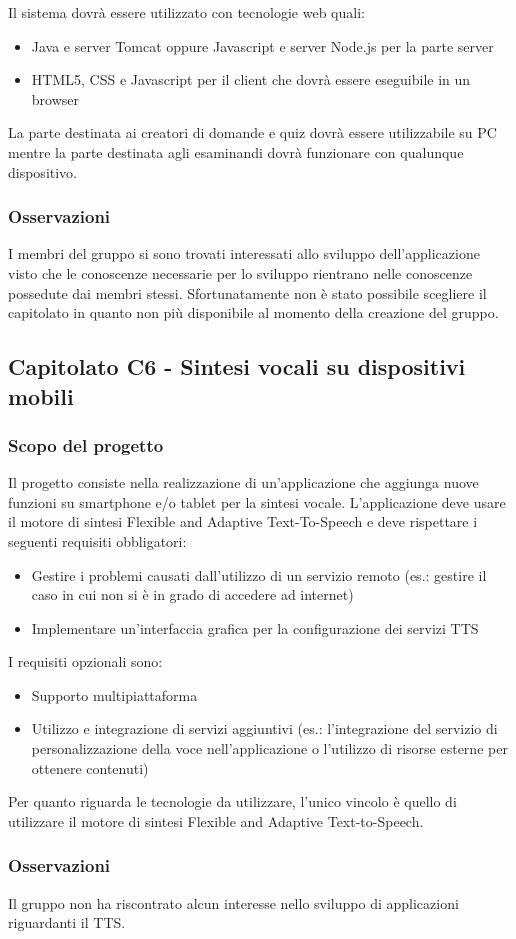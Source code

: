 Il sistema dovrà essere utilizzato con tecnologie web quali:
\begin{itemize}
	\item Java e server Tomcat oppure Javascript e server Node.js per la parte server
	\item HTML5, CSS e Javascript per il client che dovrà essere eseguibile in un browser
\end{itemize}
La parte destinata ai creatori di domande e quiz dovrà essere utilizzabile su PC mentre la parte destinata agli esaminandi
dovrà funzionare con qualunque dispositivo.

\subsubsection{Osservazioni}
I membri del gruppo si sono trovati interessati allo sviluppo dell'applicazione visto che le conoscenze necessarie per lo sviluppo rientrano
nelle conoscenze possedute dai membri stessi. Sfortunatamente non è stato possibile scegliere il capitolato in quanto non più disponibile al momento
della creazione del gruppo.

\subsection{Capitolato C6 - Sintesi vocali su dispositivi mobili}
\subsubsection{Scopo del progetto}
Il progetto consiste nella realizzazione di un'applicazione che aggiunga nuove funzioni su smartphone e/o tablet per la sintesi vocale.
L'applicazione deve usare il motore di sintesi Flexible and Adaptive Text-To-Speech e deve rispettare i seguenti requisiti obbligatori:

\begin{itemize}
	\item Gestire i problemi causati dall'utilizzo di un servizio remoto (es.: gestire il caso in cui non si è in grado di accedere ad internet)
	\item Implementare un'interfaccia grafica per la configurazione dei servizi TTS
\end{itemize}

I requisiti opzionali sono:

\begin{itemize}
	\item Supporto multipiattaforma
	\item Utilizzo e integrazione di servizi aggiuntivi (es.: l'integrazione del servizio di personalizzazione
	della voce nell'applicazione o l'utilizzo di risorse esterne per ottenere contenuti)
\end{itemize}

Per quanto riguarda le tecnologie da utilizzare, l'unico vincolo è quello di utilizzare il motore di sintesi Flexible and Adaptive Text-to-Speech.

\subsubsection{Osservazioni}
Il gruppo non ha riscontrato alcun interesse nello sviluppo di applicazioni riguardanti il TTS.
